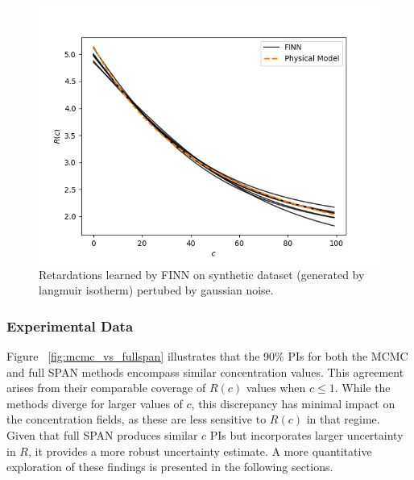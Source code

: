 \begin{figure}[h]
    \centering
    \includegraphics{figs/finn_synthetic_langmuir_c_noise.png}
    \caption{Retardations learned by FINN on synthetic dataset (generated by langmuir isotherm) pertubed by gaussian noise.}
    \label{fig:synthetic_langmuir_c_noise}
\end{figure}



\subsubsection{Experimental Data}

Figure ~\vref{fig:mcmc_vs_fullspan} illustrates that the 90\% PIs for both the MCMC and full SPAN methods encompass similar concentration values. This agreement arises from their comparable coverage of $R(c)$ values when $c \leq 1$. While the methods diverge for larger values of $c$, this discrepancy has minimal impact on the concentration fields, as these are less sensitive to $R(c)$ in that regime. Given that full SPAN produces similar $c$ PIs but incorporates larger uncertainty in $R$, it provides a more robust uncertainty estimate. A more quantitative exploration of these findings is presented in the following sections.


